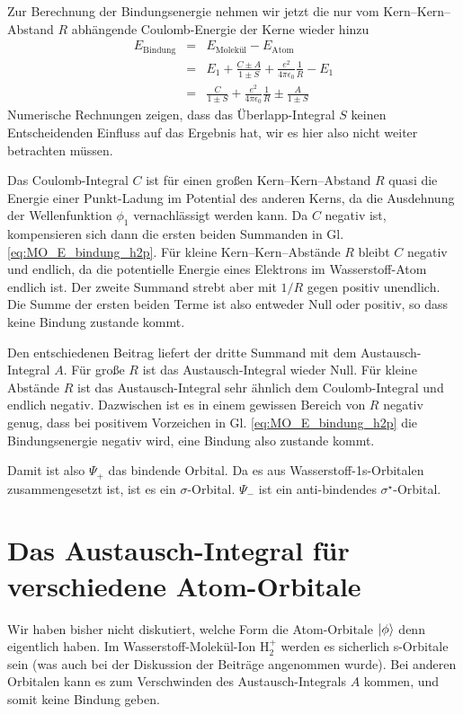 Zur Berechnung der Bindungsenergie nehmen wir jetzt die nur vom Kern--Kern--Abstand $R$ abhängende Coulomb-Energie der Kerne wieder hinzu
\begin{eqnarray}
 E_\text{Bindung} &=&  E_\text{Molekül} -  E_\text{Atom} \\
  &=&   E_1 + \frac{C \pm A}{1 \pm S} + \frac{e^2}{4 \pi \epsilon_0} \frac{1}{R} - E_1 \\
   &=&\frac{C }{1 \pm S}  + \frac{e^2}{4 \pi \epsilon_0} \frac{1}{R}  \pm \frac{ A}{1 \pm S}  \label{eq:MO_E_bindung_h2p}
\end{eqnarray}
Numerische Rechnungen zeigen, dass das Überlapp-Integral $S$ keinen Entscheidenden Einfluss auf das Ergebnis hat, wir es hier also nicht weiter betrachten müssen.

Das Coulomb-Integral $C$ ist für einen  großen Kern--Kern--Abstand $R$ quasi die Energie einer Punkt-Ladung im Potential des anderen Kerns, da die Ausdehnung der Wellenfunktion $\phi_1$ vernachlässigt werden kann. Da $C$ negativ ist, kompensieren sich dann die ersten beiden Summanden in Gl. \ref{eq:MO_E_bindung_h2p}. Für kleine Kern--Kern--Abstände $R$ bleibt $C$ negativ und endlich, da die potentielle Energie eines Elektrons im Wasserstoff-Atom endlich ist. Der zweite Summand strebt aber mit $1/R$ gegen positiv unendlich. Die Summe der ersten beiden Terme ist also entweder Null oder positiv, so dass keine Bindung zustande kommt.

Den entschiedenen Beitrag liefert der dritte Summand mit dem Austausch-Integral $A$. Für große $R$ ist das Austausch-Integral wieder Null. Für kleine Abstände $R$ ist das Austausch-Integral sehr ähnlich dem Coulomb-Integral und endlich negativ. Dazwischen ist es in einem gewissen Bereich von $R$ negativ genug, dass bei positivem Vorzeichen in Gl. \ref{eq:MO_E_bindung_h2p} die Bindungsenergie negativ wird, eine Bindung also zustande kommt.

Damit ist also $\Psi_+$ das bindende Orbital. Da es aus Wasserstoff-1s-Orbitalen zusammengesetzt ist, ist es ein $\sigma$-Orbital. $\Psi_-$ ist ein anti-bindendes $\sigma^\star$-Orbital.


\section{Das Austausch-Integral für verschiedene Atom-Orbitale}

Wir haben bisher nicht diskutiert, welche Form die Atom-Orbitale $\ket{\phi}$ denn eigentlich haben.
Im Wasserstoff-Molekül-Ion H$_2^+$ werden es sicherlich s-Orbitale sein (was auch bei der Diskussion der Beiträge angenommen wurde). Bei anderen Orbitalen kann es zum Verschwinden des Austausch-Integrals $A$ kommen, und somit keine Bindung geben.

